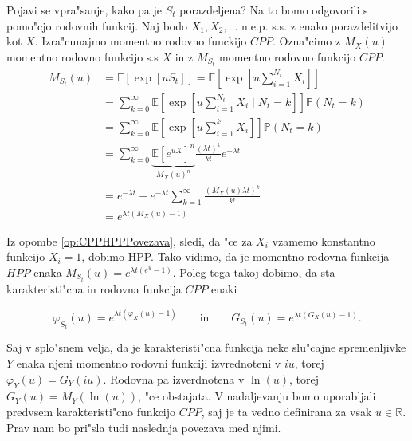 \documentclass[12pt, a4paper, reqno]{amsart}
\theoremstyle{definition} %
\theoremstyle{plain} %
\newcommand{\R}{\mathbb{R}}
\newcommand{\E}{\mathbb{E}}
\newcommand{\Prob}{\mathbb{P}}
\newcommand{\1}{\mathds{1}}
\begin{document}
    \noindent
    Pojavi se vpra"sanje, kako pa je $S_t$ porazdeljena? Na to bomo odgovorili s pomo"cjo rodovnih
    funkcij. Naj bodo $X_1, X_2, \dots$ n.e.p. s.s.  z enako porazdelitvijo kot $X$.
    Izra"cunajmo momentno rodovno funckijo $CPP$. Ozna"cimo z $M_X(u)$ momentno rodovno funkcijo 
    s.s $X$ in z $M_{S_t}$ momentno rodovno funkcijo $CPP$.
    \begin{align}
        M_{S_t}(u) 
                &= \E\left[\exp\left[uS_t\right]\right] = \nonumber
                    \E\left[\exp\left[u\sum_{i = 1}^{N_t}X_i\right]\right] \nonumber\\
                &= \sum_{k=0}^{\infty}
                    \E\left[\exp\left[u\sum_{i = 1}^{N_t}X_i\mid N_t=k\right]\right]\Prob\left(N_t = k\right) \nonumber \\ 
                &= \sum_{k=0}^{\infty}
                    \E\left[\exp\left[u\sum_{i = 1}^kX_i\right]\right]\Prob\left(N_t = k\right) \nonumber \\
                &= \sum_{k=0}^{\infty}
                    \underbrace{\E\left[e^{uX}\right]^n}_{M_X(u)^n}\frac{(\lambda t)^k}{k!}e^{-\lambda t} \label{eq:MomentS_t}\\ 
                &= e^{-\lambda t} + e^{-\lambda t}\sum_{k=1}^\infty\frac{\left(M_X(u)\lambda t\right)^k}{k!} \nonumber \\
                &= e^{\lambda t\left(M_X(u) - 1\right)} \nonumber
    \end{align}

    Iz opombe \ref{op:CPPHPPPovezava}, sledi, da "ce za $X_i$ vzamemo konstantno funkcijo 
    $X_i = 1$, dobimo HPP. Tako vidimo, da je momentno rodovna funkcija $HPP$ enaka 
    $M_{S_t}(u) = e^{\lambda t\left(e^u - 1\right)}$. Poleg tega takoj dobimo, da sta 
    karakteristi"cna in rodovna funkcija $CPP$ enaki

    \begin{equation*}
        \varphi_{S_t}(u) = e^{\lambda t\left(\varphi_X(u) - 1\right)} \qquad \text{in} \qquad 
        G_{S_t}(u) = e^{\lambda t\left(G_X(u) - 1\right)}.
    \end{equation*} 

    \noindent
    Saj v splo"snem velja, da je karakteristi"cna funkcija neke slu"cajne spremenljivke $Y$ enaka
    njeni momentno rodovni funkciji izvrednoteni v $iu$, torej $\varphi_Y(u) = G_Y(iu)$. Rodovna pa 
    izverdnotena v $\ln(u)$, torej $G_Y(u) = M_Y(\ln(u))$, "ce obstajata.
    V nadaljevanju bomo uporabljali predvsem karakteristi"cno funkcijo $CPP$, saj je ta vedno definirana 
    za vsak $u\in\R$. Prav nam bo pri"sla tudi naslednja povezava med njimi.
\end{document}

